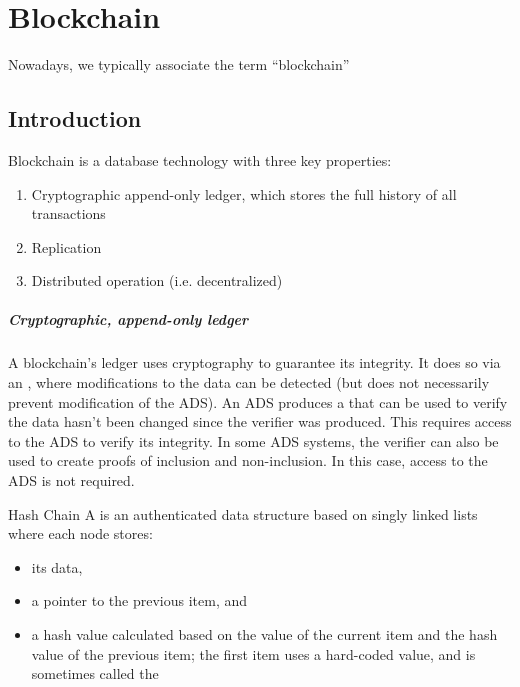 \chapter{Blockchain}

Nowadays, we typically associate the term ``blockchain'' 

\section{Introduction}

\begin{dfnbox}{Blockchain}{}
     is a database technology with three key properties:
    \begin{enumerate}
        \item Cryptographic append-only ledger, which stores the full history of all transactions
        \item Replication
        \item Distributed operation (i.e. decentralized)
    \end{enumerate}
\end{dfnbox}

\paragraph{Cryptographic, append-only ledger}
A blockchain's ledger uses cryptography to guarantee its integrity. It does so via an , where modifications to the data can be detected (but does not necessarily prevent modification of the ADS). An ADS produces a  that can be used to verify the data hasn't been changed since the verifier was produced. This requires access to the ADS to verify its integrity. In some ADS systems, the verifier can also be used to create proofs of inclusion and non-inclusion. In this case, access to the ADS is not required.

\begin{dfnbox}{Hash Chain}{}
    A  is an authenticated data structure based on singly linked lists where each node stores:
    \begin{itemize}
        \item its data,
        \item a pointer to the previous item, and
        \item a hash value calculated based on the value of the current item and the hash value of the previous item; the first item uses a hard-coded value, and is sometimes called the 
    \end{itemize}
\end{dfnbox}

